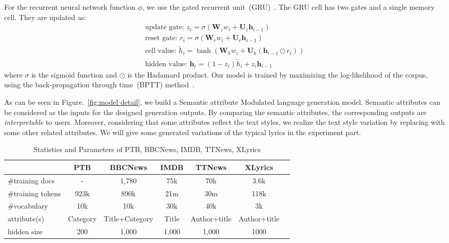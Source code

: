\documentclass[a4paper]{article}
\begin{document}
For the recurrent neural network function $\phi$, we use the gated recurrent unit~(GRU)~\cite{chung2014empirical}.
The GRU cell has two gates and a single memory cell. They are updated as:
\begin{eqnarray}\label{eqn:gru}
\nonumber\text{update gate: } z_{i}=\sigma(\mathbf{W}_{z}w_{i}+\mathbf{U}_{z}\mathbf{h}_{i-1})\\
\nonumber\text{reset gate: } r_{i}=\sigma(\mathbf{W}_{r}w_{i}+\mathbf{U}_{r}\mathbf{h}_{i-1}) \\
\nonumber\text{cell value: } \tilde{h}_{i}=\tanh(\mathbf{W}_{h}w_{i}+\mathbf{U}_{h}(\mathbf{h}_{i-1}\odot r_{i})) \\
\text{hidden value: }\mathbf{h}_{i}=(1-z_{i})\tilde{h}_{i}+z_{i}\mathbf{h}_{i-1}
\end{eqnarray}
where $\sigma$ is the sigmoid function and $\odot$ is the Hadamard product.
Our model is trained by maximizing the log-likelihood of the corpus, using the back-propagation through time~(BPTT) method~\cite{boden2002guide}.

As can be seen in Figure.~\ref{fig:model detail}, we build a Semantic attribute Modulated language generation model.
Semantic attributes can be considered as the inputs for the designed generation outputs.  %
By comparing the semantic attributes, the corresponding outputs are \emph{interpretable} to users.
Moreover, considering that some attributes reflect the text styles, we realize the text style variation by replacing with some other related attributes. We will give some generated variations of the typical lyrics in the experiment part.

%

\begin{table*}[ht]
\caption{Statistics and Parameters of PTB, BBCNews, IMDB, TTNews, XLyrics}
\label{table:dataset-statistics}
\begin{center}
\setlength\tabcolsep{3pt}
\begin{tabular}{l|cccccc}
\hline\hline
& PTB  & BBCNews & IMDB & TTNews & XLyrics\\
 \hline
\#training docs&-&1,780&75k&70k&3.6k \\
\#training tokens& 923k&890k&21m&30m&118k\\
\#vocabulary&10k&10k &30k&40k&3k\\
attribute(s) &Category & Title+Category & Title& Author+title&Author+title \\
hidden size&200 & 1,000 & 1,000&1,000 & 1000 \\
\hline\hline
\end{tabular}
\end{center}
\end{table*}
\end{document}
